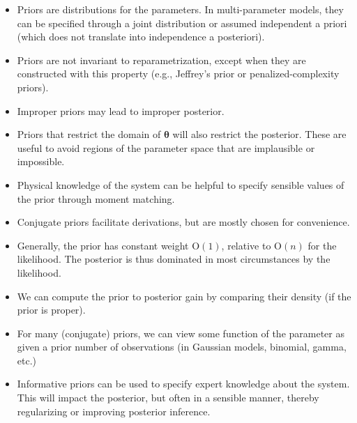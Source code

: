 \documentclass[
  11pt,
  letterpaper,
]{scrbook}
\providecommand{\tightlist}{%
  \setlength{\itemsep}{0pt}\setlength{\parskip}{0pt}}
\theoremstyle{definition}
\theoremstyle{plain}
\theoremstyle{plain}
\theoremstyle{plain}
\theoremstyle{definition}
\theoremstyle{definition}
\theoremstyle{plain}
\theoremstyle{plain}
\theoremstyle{remark}
\begin{document}
\begin{tcolorbox}[enhanced jigsaw, arc=.35mm, bottomrule=.15mm, bottomtitle=1mm, breakable, colback=white, colbacktitle=quarto-callout-important-color!10!white, colframe=quarto-callout-important-color-frame, coltitle=black, left=2mm, leftrule=.75mm, opacityback=0, opacitybacktitle=0.6, rightrule=.15mm, title=\textcolor{quarto-callout-important-color}{\faExclamation}\hspace{0.5em}{\textbf{Summary}:}, titlerule=0mm, toprule=.15mm, toptitle=1mm]

\begin{itemize}
\tightlist
\item
  Priors are distributions for the parameters. In multi-parameter
  models, they can be specified through a joint distribution or assumed
  independent a priori (which does not translate into independence a
  posteriori).
\item
  Priors are not invariant to reparametrization, except when they are
  constructed with this property (e.g., Jeffrey's prior or
  penalized-complexity priors).
\item
  Improper priors may lead to improper posterior.
\item
  Priors that restrict the domain of \(\boldsymbol{\theta}\) will also
  restrict the posterior. These are useful to avoid regions of the
  parameter space that are implausible or impossible.
\item
  Physical knowledge of the system can be helpful to specify sensible
  values of the prior through moment matching.
\item
  Conjugate priors facilitate derivations, but are mostly chosen for
  convenience.
\item
  Generally, the prior has constant weight \(\mathrm{O}(1)\), relative
  to \(\mathrm{O}(n)\) for the likelihood. The posterior is thus
  dominated in most circumstances by the likelihood.
\item
  We can compute the prior to posterior gain by comparing their density
  (if the prior is proper).
\item
  For many (conjugate) priors, we can view some function of the
  parameter as given a prior number of observations (in Gaussian models,
  binomial, gamma, etc.)
\item
  Informative priors can be used to specify expert knowledge about the
  system. This will impact the posterior, but often in a sensible
  manner, thereby regularizing or improving posterior inference.
\end{itemize}

\end{tcolorbox}
\end{document}

